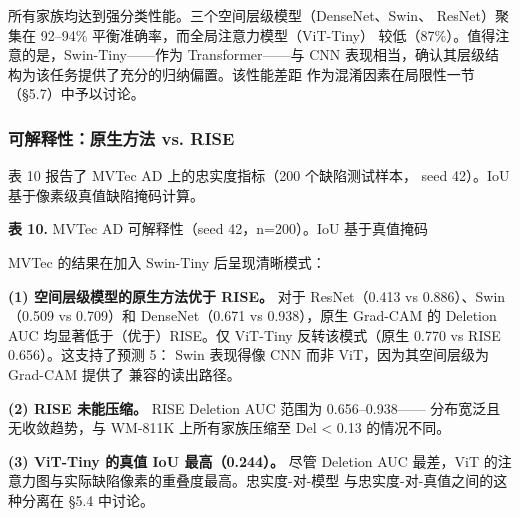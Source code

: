 \documentclass[11pt,a4paper]{article}
\begin{document}
所有家族均达到强分类性能。三个空间层级模型（DenseNet、Swin、 ResNet）聚集在 92–94\% 平衡准确率，而全局注意力模型（ViT-Tiny） 较低（87\%）。值得注意的是，Swin-Tiny——作为 Transformer——与 CNN 表现相当，确认其层级结构为该任务提供了充分的归纳偏置。该性能差距 作为混淆因素在局限性一节（§5.7）中予以讨论。

\subsubsection{可解释性：原生方法 vs. RISE}

表 10 报告了 MVTec AD 上的忠实度指标（200 个缺陷测试样本， seed 42）。IoU 基于像素级真值缺陷掩码计算。

\begin{center}
\small \textbf{表 10.} MVTec AD 可解释性（seed 42，n=200）。IoU 基于真值掩码
\end{center}

\noindent{}


MVTec 的结果在加入 Swin-Tiny 后呈现清晰模式：

\textbf{(1) 空间层级模型的原生方法优于 RISE。} 对于 ResNet（0.413 vs 0.886）、Swin（0.509 vs 0.709）和 DenseNet（0.671 vs 0.938），原生 Grad-CAM 的 Deletion AUC 均显著低于（优于）RISE。仅 ViT-Tiny 反转该模式（原生 0.770 vs RISE 0.656）。这支持了预测 5： Swin 表现得像 CNN 而非 ViT，因为其空间层级为 Grad-CAM 提供了 兼容的读出路径。

\textbf{(2) RISE 未能压缩。} RISE Deletion AUC 范围为 0.656–0.938—— 分布宽泛且无收敛趋势，与 WM-811K 上所有家族压缩至 Del < 0.13 的情况不同。

\textbf{(3) ViT-Tiny 的真值 IoU 最高（0.244）。} 尽管 Deletion AUC 最差，ViT 的注意力图与实际缺陷像素的重叠度最高。忠实度-对-模型 与忠实度-对-真值之间的这种分离在 §5.4 中讨论。
\end{document}
